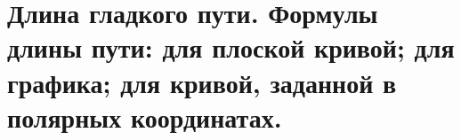 \documentclass[../main.tex]{subfiles}
\begin{document}
\newpage
\section{Длина гладкого пути. Формулы длины пути: для плоской кривой; для графика; для кривой, заданной в полярных координатах.}
\end{document}
